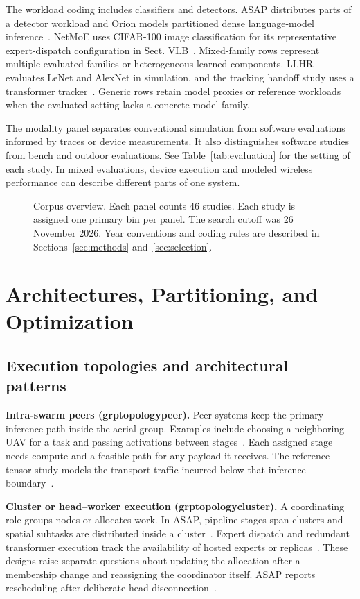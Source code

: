 \documentclass[journal]{IEEEtran}
\newcommand{\groupcite}[2]{\csname grp#1#2\endcsname}
\begin{document}
The workload coding includes classifiers and detectors. ASAP distributes parts of a detector workload and Orion models partitioned dense language-model inference~\cite{R0014,R0074}. NetMoE uses CIFAR-100 image classification for its representative expert-dispatch configuration in Sect. VI.B~\cite{R0118}. Mixed-family rows represent multiple evaluated families or heterogeneous learned components. LLHR evaluates LeNet and AlexNet in simulation, and the tracking handoff study uses a transformer tracker~\cite{R0082,R0292}. Generic rows retain model proxies or reference workloads when the evaluated setting lacks a concrete model family.

The modality panel separates conventional simulation from software evaluations informed by traces or device measurements. It also distinguishes software studies from bench and outdoor evaluations. See Table~\ref{tab:evaluation} for the setting of each study. In mixed evaluations, device execution and modeled wireless performance can describe different parts of one system.

\begin{figure}[!tp]
\centering

\caption{Corpus overview. Each panel counts 46 studies. Each study is assigned one primary bin per panel. The search cutoff was 26 November 2026. Year conventions and coding rules are described in Sections~\ref{sec:methods} and~\ref{sec:selection}.}\label{fig:macro}
\end{figure}


\section{Architectures, Partitioning, and Optimization}\label{sec:architecture}
\subsection{Execution topologies and architectural patterns}
\textbf{Intra-swarm peers (\groupcite{topology}{peer}).}
Peer systems keep the primary inference path inside the aerial group. Examples include choosing a neighboring UAV for a task and passing activations between stages~\cite{R0010,R0092}. Each assigned stage needs compute and a feasible path for any payload it receives. The reference-tensor study models the transport traffic incurred below that inference boundary~\cite{R0121}.

\textbf{Cluster or head--worker execution (\groupcite{topology}{cluster}).}
A coordinating role groups nodes or allocates work. In ASAP, pipeline stages span clusters and spatial subtasks are distributed inside a cluster~\cite{R0014}. Expert dispatch and redundant transformer execution track the availability of hosted experts or replicas~\cite{R0110,R0118}. These designs raise separate questions about updating the allocation after a membership change and reassigning the coordinator itself. ASAP reports rescheduling after deliberate head disconnection~\cite{R0014}.
\end{document}
